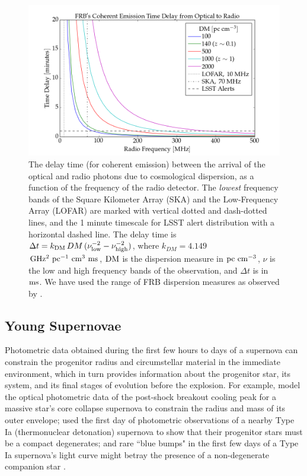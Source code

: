 \documentclass[DM,lsstdraft,authoryear,toc]{lsstdoc}
\begin{document}
\begin{figure}[h]
\begin{center}
\includegraphics[width=15cm]{figures/frb_optical_delays.png}
\caption{The delay time (for coherent emission) between the arrival of the optical and radio photons due to cosmological dispersion, as a function of the frequency of the radio detector. The {\it lowest} frequency bands of the Square Kilometer Array (SKA) and the Low-Frequency Array (LOFAR) are marked with vertical dotted and dash-dotted lines, and the 1 minute timescale for LSST alert distribution with a horizontal dashed line. The delay time is $\Delta t = k_{\rm DM}\,DM\,(\nu_{\rm low}^{-2} - \nu_{\rm high}^{-2})$, where $k_{DM}=4.149$ $\rm GHz^2\ pc^{-1}\ cm^3\ ms$, ${\rm DM}$ is the dispersion measure in $\rm pc\ cm^{-3}$, $\nu$ is the low and high frequency bands of the observation, and $\Delta t$ is in $\rm ms$. We have used the range of FRB dispersion measures as observed by \cite{2018Natur.562..386S}. \label{fig:sci_frb}}
\end{center}
\end{figure}

\subsection{Young Supernovae}\label{ssec:latency_ysne}

Photometric data obtained during the first few hours to days of a supernova can constrain the progenitor radius and circumstellar material in the immediate environment, which in turn provides information about the progenitor star, its system, and its final stages of evolution before the explosion.
For example, \citet{2018Natur.554..497B} model the optical photometric data of the post-shock breakout cooling peak for a massive star's core collapse supernova to constrain the radius and mass of its outer envelope; \citet{2012ApJ...744L..17B} used the first day of photometric observations of a nearby Type Ia (thermonuclear detonation) supernova to show that their progenitor stars must be a compact degenerates; and rare ``blue bumps" in the first few days of a Type Ia supernova's light curve might betray the presence of a non-degenerate companion star \citep[e.g.,][]{2010ApJ...708.1025K,2017ApJ...845L..11H}.
\end{document}

